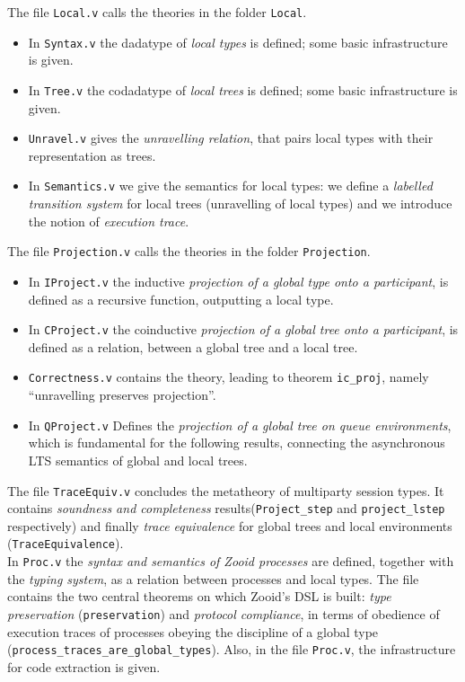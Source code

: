 \documentclass[11pt, a4paper,UKenglish,cleveref, autoref, thm-restate]{article}
\begin{document}
The file \texttt{Local.v} calls the theories in the folder \texttt{Local}.
\begin{itemize}
\item In \texttt{Syntax.v} the dadatype of \emph{local types} is defined; some basic infrastructure is given.
\item In \texttt{Tree.v} the codadatype of \emph{local trees} is defined; some basic infrastructure is given.
\item \texttt{Unravel.v} gives the \emph{unravelling relation}, that pairs local types with their representation as trees.
\item In \texttt{Semantics.v} we give the semantics for local types: we define a \emph{labelled transition system} for local trees (unravelling of local types) and we introduce the notion of \emph{execution trace}.
\end{itemize}

The file \texttt{Projection.v} calls the theories in the folder \texttt{Projection}.
\begin{itemize}
\item In \texttt{IProject.v} the inductive \emph{projection of a global type onto a participant}, is defined as a recursive function, outputting a local type.
\item In \texttt{CProject.v} the coinductive \emph{projection of a global tree onto a participant}, is defined as a relation, between a global tree and a local tree.
\item \texttt{Correctness.v} contains the theory, leading to theorem \texttt{ic\_proj}, namely ``unravelling preserves projection''.
\item In \texttt{QProject.v} Defines the \emph{projection of a global tree on queue environments}, which is fundamental for the following results, connecting the asynchronous LTS semantics of global and local trees.
\end{itemize}

The file \texttt{TraceEquiv.v} concludes the metatheory of multiparty session types. It contains \emph{soundness and completeness} results(\texttt{Project\_step} and \texttt{project\_lstep} respectively) and finally \emph{trace equivalence} for global trees and local environments (\texttt{TraceEquivalence}).\\

In \texttt{Proc.v} the \emph{syntax and semantics of Zooid processes} are defined, together with the \emph{typing system}, as a relation between processes and local types. The file contains the two central theorems on which Zooid's DSL is built: \emph{type preservation} (\texttt{preservation}) and \emph{protocol compliance}, in terms of obedience of execution traces of processes obeying the discipline of a global type  (\texttt{process\_traces\_are\_global\_types}). Also, in the file \texttt{Proc.v}, the infrastructure for code extraction is given.\\
\end{document}
